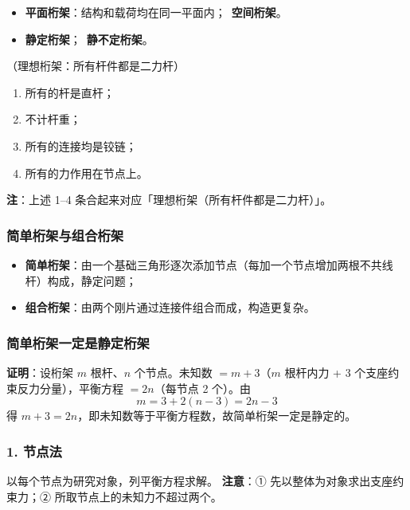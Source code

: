 \begin{itemize}
\item \textbf{平面桁架}：结构和载荷均在同一平面内；\ \textbf{空间桁架}。
\item \textbf{静定桁架}；\ \textbf{静不定桁架}。
\end{itemize}

（理想桁架：所有杆件都是二力杆）
\begin{enumerate}
\item 所有的杆是直杆；
\item 不计杆重；
\item 所有的连接均是铰链；
\item 所有的力作用在节点上。
\end{enumerate}
\textbf{注}：上述 1–4 条合起来对应「理想桁架（所有杆件都是二力杆）」。

\subsubsection{简单桁架与组合桁架}
\begin{itemize}
\item \textbf{简单桁架}：由一个基础三角形逐次添加节点（每加一个节点增加两根不共线杆）构成，静定问题；
\item \textbf{组合桁架}：由两个刚片通过连接件组合而成，构造更复杂。
\end{itemize}

\subsubsection{简单桁架一定是静定桁架}
\textbf{证明}：设桁架 $m$ 根杆、$n$ 个节点。未知数 $=m+3$（$m$ 根杆内力 + 3 个支座约束反力分量），平衡方程 $=2n$（每节点 2 个）。由
\begin{equation}
m=3+2(n-3)=2n-3
\label{eq:2-桁架-静定}
\end{equation}
得 $m+3=2n$，即未知数等于平衡方程数，故简单桁架一定是静定的。

\subsubsection{1. 节点法} 以每个节点为研究对象，列平衡方程求解。
\textbf{注意}：① 先以整体为对象求出支座约束力；② 所取节点上的未知力不超过两个。

